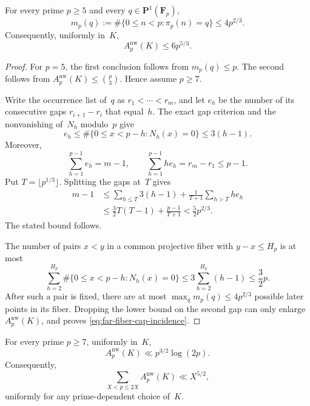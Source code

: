 \begin{lemma}
\label{lem:far-projective-fiber-cap}
For every prime $p\ge5$ and every
$q\in\mathbf P^1(\mathbf F_p)$,
\[
 m_p(q):=\#\{0\le n<p:\pi_p(n)=q\}\le4p^{2/3}.
\]
Consequently, uniformly in~$K$,
\begin{equation}
 A_p^{\mathrm{nw}}(K)\le6p^{5/3}.
\label{eq:far-fiber-cap-incidence}
\end{equation}
\end{lemma}

\begin{proof}
For $p=5$, the first conclusion follows from $m_p(q)\le p$.
The second follows from
$A_p^{\mathrm{nw}}(K)\le\binom p3$.
Hence assume $p\ge7$.

Write the occurrence list of~$q$ as
$r_1<\cdots<r_m$, and let $e_h$ be the number of its consecutive gaps
$r_{i+1}-r_i$ that equal~$h$.  The exact gap criterion and the
nonvanishing of~$N_h$ modulo~$p$ give
\[
 e_h\le\#\{0\le x<p-h:N_h(x)=0\}\le3(h-1).
\]
Moreover,
\[
 \sum_{h=1}^{p-1}e_h=m-1,
 \qquad
 \sum_{h=1}^{p-1}he_h=r_m-r_1\le p-1.
\]
Put $T=\lfloor p^{1/3}\rfloor$.  Splitting the gaps at~$T$ gives
\[
 \begin{split}
 m-1
 &\le \sum_{h\le T}3(h-1)
      +\frac1{T+1}\sum_{h>T}he_h\\
 &\le\frac32T(T-1)+\frac{p-1}{T+1}
 <\frac52p^{2/3}.
 \end{split}
\]
The stated bound follows.

The number of pairs $x<y$ in a common projective fiber with
$y-x\le H_p$ is at most
\[
 \sum_{h=2}^{H_p}\#\{0\le x<p-h:N_h(x)=0\}
 \le3\sum_{h=2}^{H_p}(h-1)
 \le\frac32p.
\]
After such a pair is fixed, there are at most
$\max_q m_p(q)\le4p^{2/3}$ possible later points in its fiber.  Dropping
the lower bound on the second gap can only enlarge
$A_p^{\mathrm{nw}}(K)$, and proves
\eqref{eq:far-fiber-cap-incidence}.
\end{proof}

\begin{lemma}
\label{lem:far-reciprocal-gap-triples}
For every prime $p\ge7$, uniformly in~$K$,
\begin{equation}
 A_p^{\mathrm{nw}}(K)\ll p^{3/2}\log(2p).
\label{eq:far-reciprocal-gap-triples}
\end{equation}
Consequently,
\begin{equation}
 \sum_{X<p\le2X}A_p^{\mathrm{nw}}(K)\ll X^{5/2},
\label{eq:far-reciprocal-gap-dyadic}
\end{equation}
uniformly for any prime-dependent choice of~$K$.
\end{lemma}

